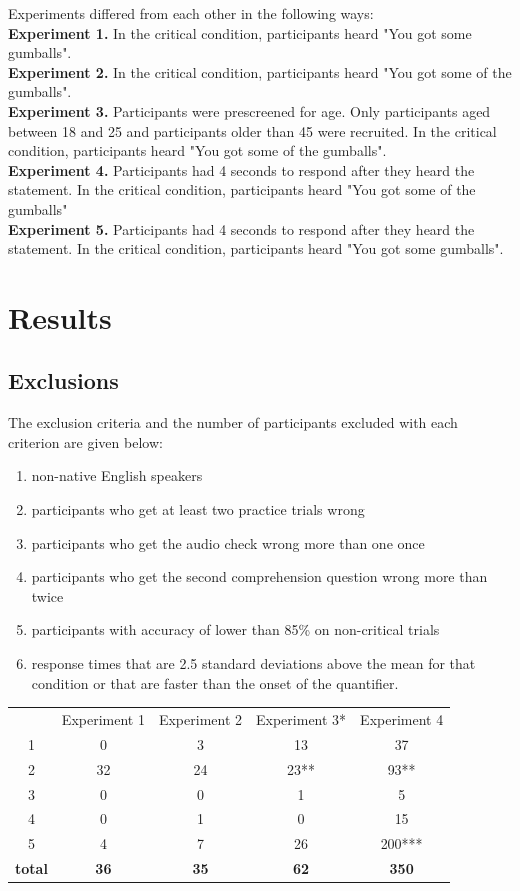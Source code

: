\documentclass[12pt]{article}
\begin{document}
Experiments differed from each other in the following ways:\\
\textbf{Experiment 1.} In the critical condition, participants heard "You got some gumballs".\\
\textbf{Experiment 2.} In the critical condition, participants heard "You got some of the gumballs".\\
\textbf{Experiment 3.} Participants were prescreened for age. Only participants aged between 18 and 25 and participants older than 45 were recruited. In the critical condition, participants heard "You got some of the gumballs".\\
\textbf{Experiment 4.} Participants had 4 seconds to respond after they heard the statement. In the critical condition, participants heard "You got some of the gumballs" \\
\textbf{Experiment 5.}  Participants had 4 seconds to respond after they heard the statement. In the critical condition, participants heard "You got some gumballs".

\section{Results}

\subsection*{Exclusions}
The exclusion criteria and the number of participants excluded with each criterion are given below:

\begin{enumerate}
\item non-native English speakers 
\item participants who get at least two practice trials wrong 
\item participants who get the audio check wrong more than one once 
\item participants who get the second comprehension question wrong more than twice 
\item participants with accuracy of lower than 85\% on non-critical trials 
\item response times that are 2.5 standard deviations above the mean for that condition or that are faster than the onset of the quantifier.
\end{enumerate}

\begin{table}[h]
    \begin{tabular}{ccccc}
     & Experiment 1 & Experiment 2  & Experiment 3*  & Experiment 4 \\
    1 & 0 & 3 & 13 & 37 \\
    2 & 32 & 24 & 23** & 93** \\
    3 & 0 & 0 & 1 & 5 \\
    4 & 0 & 1 & 0 & 15 \\
    5 & 4 & 7 & 26 & 200*** \\
    \textbf{total} & \textbf{36} & \textbf{35} & \textbf{62} & \textbf{350} \\
    \end{tabular}
\end{table}
\end{document}
